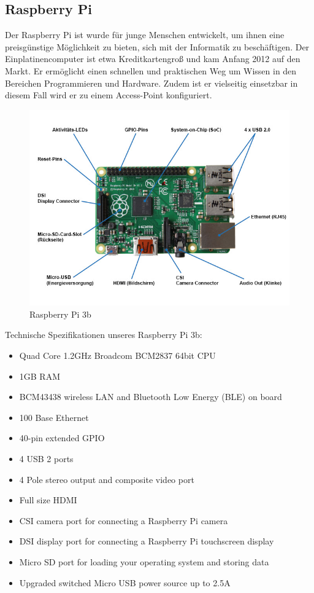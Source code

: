 \documentclass[a4paper,11pt,singlespacing]{article}
\begin{document}
    		\subsection{Raspberry Pi}
    			Der Raspberry Pi ist wurde für junge Menschen entwickelt, um ihnen eine preisgünstige Möglichkeit zu bieten, sich mit der Informatik zu beschäftigen. Der Einplatinencomputer ist etwa Kreditkartengroß und kam Anfang 2012 auf den Markt. Er ermöglicht einen schnellen und praktischen Weg um Wissen in den Bereichen Programmieren und Hardware. Zudem ist er vielseitig einsetzbar in diesem Fall wird er zu einem Access-Point konfiguriert. 
    			\begin{figure}[ht]
    				\centering
	    			\includegraphics[scale=0.5]{raspberry_pi_3b}
	    				\caption{Raspberry Pi 3b}
	    				\label{raspberrypi3b}
				\end{figure}
				Technische Spezifikationen unseres Raspberry Pi 3b:
				\begin{itemize}
					\item Quad Core 1.2GHz Broadcom BCM2837 64bit CPU
					\item 1GB RAM
					\item BCM43438 wireless LAN and Bluetooth Low Energy (BLE) on board
					\item 100 Base Ethernet
					\item 40-pin extended GPIO
					\item 4 USB 2 ports
					\item 4 Pole stereo output and composite video port
					\item Full size HDMI
					\item CSI camera port for connecting a Raspberry Pi camera
					\item DSI display port for connecting a Raspberry Pi touchscreen display
					\item Micro SD port for loading your operating system and storing data
					\item Upgraded switched Micro USB power source up to 2.5A
				\end{itemize}
\end{document}
